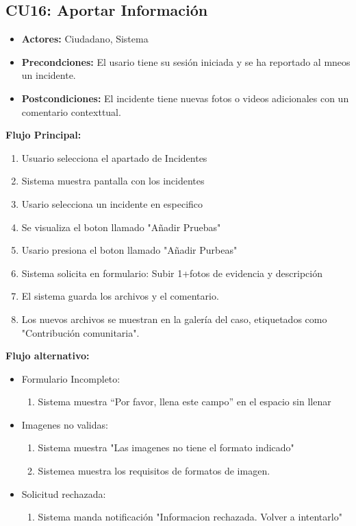 \begin{multicols}{2}
\subsection*{CU16: Aportar Información}
\begin{itemize}
    \item \textbf{Actores:} Ciudadano, Sistema
    \item \textbf{Precondciones:} El usario tiene su sesión iniciada y se ha reportado al mneos un incidente.
    \item \textbf{Postcondiciones:} El incidente tiene nuevas fotos o videos adicionales con un comentario contexttual.
\end{itemize}
\textbf{Flujo Principal:}
\begin{enumerate}
    \item Usuario selecciona el apartado de Incidentes
    \item Sistema muestra pantalla con los incidentes
    \item Usario selecciona un incidente en especifico
    \item Se visualiza el boton llamado "Añadir Pruebas"
    \item Usario presiona el boton llamado "Añadir Purbeas"
    \item Sistema solicita en formulario: Subir 1+fotos de evidencia y descripción
    \item El sistema guarda los archivos y el comentario.
    \item Los nuevos archivos se muestran en la galería del caso, etiquetados como "Contribución comunitaria".
\end{enumerate}

\textbf{Flujo alternativo:}
\begin{itemize}
    \item Formulario Incompleto:
    \begin{enumerate}
        \item Sistema muestra “Por favor, llena este campo” en el espacio sin llenar
    \end{enumerate}
    \item Imagenes no validas:
    \begin{enumerate}
        \item Sistema muestra "Las imagenes no tiene el formato indicado"
        \item Sistemea muestra los requisitos de formatos de imagen.
    \end{enumerate}
    \item Solicitud rechazada:
    \begin{enumerate}
        \item Sistema manda notificación "Informacion rechazada. Volver a intentarlo"
    \end{enumerate}
\end{itemize}


\end{multicols}
